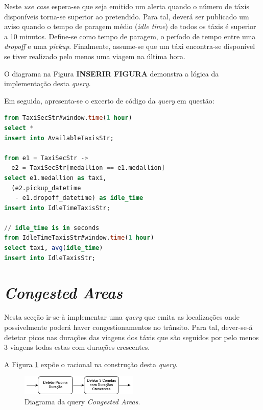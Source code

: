 \documentclass[article]{IEEEtran}
\begin{document}
Neste \textit{use case} espera-se que seja emitido um alerta quando o número de táxis disponíveis torna-se superior ao pretendido. Para tal, deverá ser publicado um aviso quando o tempo de paragem médio (\textit{idle time}) de todos os táxis é superior a 10 minutos. Define-se como tempo de paragem, o período de tempo entre uma \textit{dropoff} e uma \textit{pickup}. Finalmente, assume-se que um táxi encontra-se disponível se tiver realizado pelo menos uma viagem na última hora.

O diagrama na Figura \textbf{INSERIR FIGURA} demonstra a lógica da implementação desta \textit{query}.

Em seguida, apresenta-se o excerto de código da \textit{query} em questão:

\begin{lstlisting}[language=SQL]
from TaxiSecStr#window.time(1 hour)
select *
insert into AvailableTaxisStr;

from e1 = TaxiSecStr -> 
  e2 = TaxiSecStr[medallion == e1.medallion]
select e1.medallion as taxi,
  (e2.pickup_datetime 
   - e1.dropoff_datetime) as idle_time
insert into IdleTimeTaxisStr;

// idle_time is in seconds
from IdleTimeTaxisStr#window.time(1 hour)
select taxi, avg(idle_time)
insert into IdleTaxisStr;
\end{lstlisting}



\section{\textit{Congested Areas}}

Nesta secção ir-se-à implementar uma \textit{query} que emita as localizações onde possivelmente poderá haver congestionamentos no trânsito. Para tal, dever-se-á detetar picos nas durações das viagens dos táxis que são seguidos por pelo menos 3 viagens todas estas com durações crescentes.

A Figura \ref{fig:congestedAreasDiagram} expõe o racional na construção desta \textit{query}.

\begin{figure}[hbtp]
    \centering
        \includegraphics[width=0.5\textwidth]{images/congestedAreas}
    \caption{Diagrama da query \textit{Congested Areas}.}
    \label{fig:congestedAreasDiagram}
\end{figure}
\end{document}
